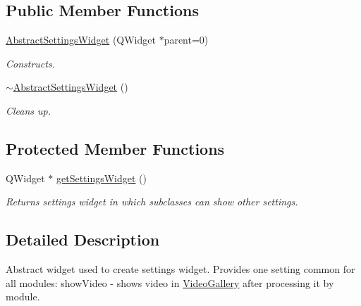\subsection*{Public Member Functions}
\begin{DoxyCompactItemize}
\item 
\hyperlink{class_abstract_settings_widget_ae1febbb1cfae0f5e21fb2ab86d301211}{AbstractSettingsWidget} (QWidget $\ast$parent=0)
\begin{DoxyCompactList}\small\item\em Constructs. \item\end{DoxyCompactList}\item 
\hypertarget{class_abstract_settings_widget_a93267e92d5d37f97f034c3a8ddc575ed}{
\hyperlink{class_abstract_settings_widget_a93267e92d5d37f97f034c3a8ddc575ed}{$\sim$AbstractSettingsWidget} ()}
\label{db/dcb/class_abstract_settings_widget_a93267e92d5d37f97f034c3a8ddc575ed}

\begin{DoxyCompactList}\small\item\em Cleans up. \item\end{DoxyCompactList}\end{DoxyCompactItemize}
\subsection*{Protected Member Functions}
\begin{DoxyCompactItemize}
\item 
QWidget $\ast$ \hyperlink{class_abstract_settings_widget_afc0c4a698fa75911990a3af2623b28b6}{getSettingsWidget} ()
\begin{DoxyCompactList}\small\item\em Returns settings widget in which subclasses can show other settings. \item\end{DoxyCompactList}\end{DoxyCompactItemize}


\subsection{Detailed Description}
Abstract widget used to create settings widget. Provides one setting common for all modules: showVideo -\/ shows video in \hyperlink{class_video_gallery}{VideoGallery} after processing it by module. 

